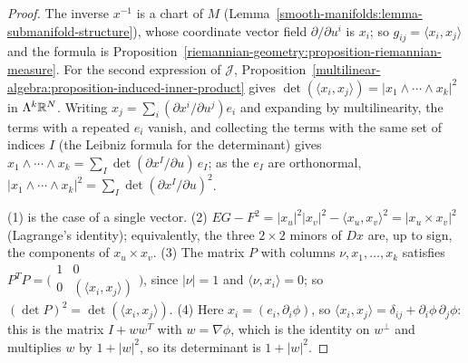 \begin{proof}
The inverse $x^{-1}$ is a chart of $M$ (Lemma~\ref{smooth-manifolds:lemma-submanifold-structure}), whose coordinate vector field $\partial/\partial u^i$ is $x_i$;
so $g_{ij} = \langle x_i, x_j\rangle$ and the formula is Proposition~\ref{riemannian-geometry:proposition-riemannian-measure}. For the second expression of
$\mathcal{J}$, Proposition~\ref{multilinear-algebra:proposition-induced-inner-product} gives $\det(\langle x_i, x_j\rangle) = |x_1 \wedge \cdots \wedge x_k|^2$ in
$\Lambda^k\mathbb{R}^N$. Writing $x_j = \sum_i(\partial x^i/\partial u^j)e_i$ and expanding by multilinearity, the terms with a repeated $e_i$ vanish, and collecting the
terms with the same set of indices $I$ (the Leibniz formula for the determinant) gives $x_1 \wedge \cdots \wedge x_k = \sum_I\det(\partial x^I/\partial u)\,e_I$; as the
$e_I$ are orthonormal, $|x_1 \wedge \cdots \wedge x_k|^2 = \sum_I\det(\partial x^I/\partial u)^2$.

(1) is the case of a single vector. (2) $EG - F^2 = |x_u|^2|x_v|^2 - \langle x_u, x_v\rangle^2 = |x_u \times x_v|^2$ (Lagrange's identity); equivalently, the three
$2 \times 2$ minors of $Dx$ are, up to sign, the components of $x_u \times x_v$. (3) The matrix $P$ with columns $\nu, x_1, \ldots, x_k$ satisfies
$P^TP = \bigl(\begin{smallmatrix} 1 & 0\\ 0 & (\langle x_i, x_j\rangle)\end{smallmatrix}\bigr)$, since $|\nu| = 1$ and $\langle\nu, x_i\rangle = 0$; so
$(\det P)^2 = \det(\langle x_i, x_j\rangle)$. (4) Here $x_i = (e_i, \partial_i\phi)$, so $\langle x_i, x_j\rangle = \delta_{ij} + \partial_i\phi\,\partial_j\phi$: this is
the matrix $I + ww^T$ with $w = \nabla\phi$, which is the identity on $w^\perp$ and multiplies $w$ by $1 + |w|^2$, so its determinant is $1 + |w|^2$.
\end{proof}

